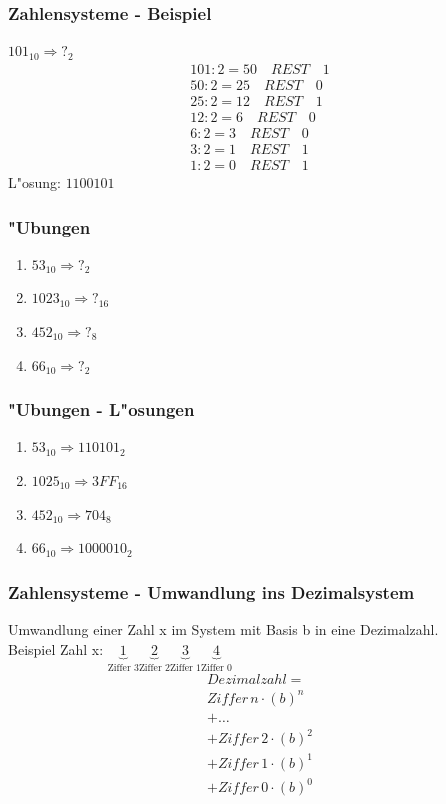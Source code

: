 \documentclass{beamer}
\begin{document}
\frame
{
	\frametitle{Zahlensysteme - Beispiel}
	$101_{10} \Rightarrow ?_2$\\
	\vspace{3mm}
	\begin{displaymath}
	\begin{array}{ll}
	101 : 2 = 50 \quad REST \quad 1 \\
	50 : 2 = 25 \quad REST \quad 0 \\
	25 : 2 = 12 \quad REST \quad 1 \\
	12 : 2 = 6 \quad REST \quad 0 \\
	6: 2 = 3 \quad REST \quad 0 \\
	3 : 2 = 1 \quad REST \quad 1 \\
	1 : 2 = 0 \quad REST \quad 1
	\end{array}
	\end{displaymath}
	\vspace{3mm}
	L"osung: $1100101$
}

\frame
{
	\frametitle{"Ubungen}
	\begin{enumerate}
	\item $53_{10} \Rightarrow ?_2$
	\item $1023_{10} \Rightarrow ?_{16}$
	\item $452_{10} \Rightarrow ?_8$
	\item $66_{10} \Rightarrow ?_2$
	\end{enumerate}
}

\frame
{
	\frametitle{"Ubungen - L"osungen}
	\begin{enumerate}
	\item $53_{10} \Rightarrow 110101_2$
	\item $1025_{10} \Rightarrow 3FF_{16}$
	\item $452_{10} \Rightarrow 704_8$
	\item $66_{10} \Rightarrow 1000010_2$
	\end{enumerate}
}

\frame
{
	\frametitle{Zahlensysteme - Umwandlung ins Dezimalsystem}
	Umwandlung einer Zahl x im System mit Basis b in eine Dezimalzahl.\\
	Beispiel Zahl x: $\underbrace{1}_\text{Ziffer 3} \underbrace{2}_\text{Ziffer 2} \underbrace{3}_\text{Ziffer 1} \underbrace{4}_\text{Ziffer 0}$\\
	\vspace{3mm}
	\begin{displaymath}
	\begin{array}{ll}
	Dezimalzahl = \\
	Ziffer \, n \cdot (b)^n \\
	+ \dots \\
	+ Ziffer \, 2 \cdot (b)^2 \\
	+ Ziffer \, 1 \cdot (b)^1 \\
	+ Ziffer \, 0 \cdot (b)^0
	\end{array}
	\end{displaymath}
}
\end{document}
